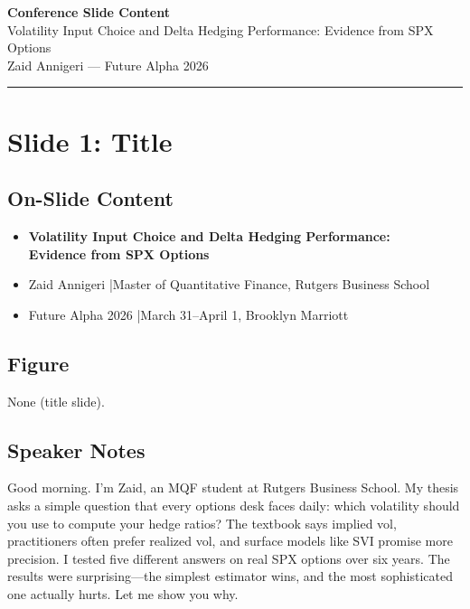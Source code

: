 \documentclass[11pt, letterpaper]{article}
\begin{document}
\begin{center}
{\Large\bfseries Conference Slide Content}\\[6pt]
{\large Volatility Input Choice and Delta Hedging Performance: Evidence from SPX Options}\\[4pt]
{\normalsize Zaid Annigeri --- Future Alpha 2026}
\end{center}

\vspace{0.5em}
\noindent\rule{\textwidth}{0.8pt}

\section{Slide 1: Title}

\subsection*{On-Slide Content}
\begin{itemize}[nosep]
  \item \textbf{Volatility Input Choice and Delta Hedging Performance:}\\
        \textbf{Evidence from SPX Options}
  \item Zaid Annigeri \quad|\quad Master of Quantitative Finance, Rutgers Business School
  \item Future Alpha 2026 \quad|\quad March 31--April 1, Brooklyn Marriott
\end{itemize}

\subsection*{Figure}
None (title slide).

\subsection*{Speaker Notes}
Good morning. I'm Zaid, an MQF student at Rutgers Business School. My thesis asks a simple question that every options desk faces daily: which volatility should you use to compute your hedge ratios? The textbook says implied vol, practitioners often prefer realized vol, and surface models like SVI promise more precision. I tested five different answers on real SPX options over six years. The results were surprising---the simplest estimator wins, and the most sophisticated one actually hurts. Let me show you why.
\end{document}
